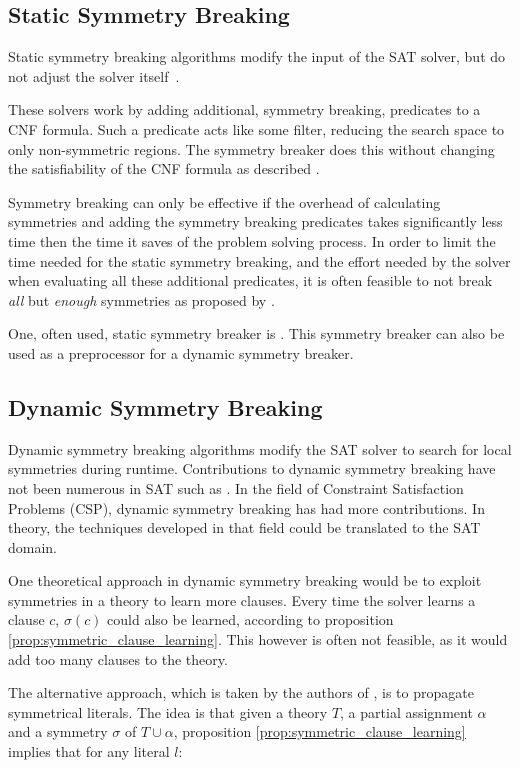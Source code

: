 \subsection{Static Symmetry Breaking}
	Static symmetry breaking algorithms modify the input of the SAT solver, but do not
	adjust the solver itself~\cite{sakallah2009symmetry}.

	These solvers work by adding additional, symmetry breaking, predicates to a CNF 
	formula. Such a predicate acts like some filter, reducing the search space to only 
	non-symmetric regions. The symmetry breaker does this without changing the 
	satisfiability of the CNF formula as described \cite{aloul2003shatter}.

	Symmetry breaking can only be effective if the overhead of calculating symmetries and
	adding the symmetry breaking predicates takes significantly less time then the time it
	saves of the problem solving process. In order to limit the time needed for the static
	symmetry breaking, and the effort needed by the solver when evaluating all these
	additional predicates, it is often feasible to not break \emph{all} but \emph{enough} 
	symmetries as proposed by \cite{aloul2003shatter}.
	
	One, often used, static symmetry breaker is \cite{aloul2003shatter}. This symmetry
	breaker can also be used as a preprocessor for a dynamic symmetry breaker.

\subsection{Dynamic Symmetry Breaking}
	Dynamic symmetry breaking algorithms modify the SAT solver to search for local
	symmetries during runtime. Contributions to dynamic symmetry breaking have not been
	numerous in SAT such as \cite{sabharwal2005symchaff}. In the field of Constraint Satisfaction
	Problems (CSP), dynamic symmetry breaking has had more contributions.
	In theory, the techniques developed in that field could be translated to the SAT domain.

	One theoretical approach in dynamic symmetry breaking would be to exploit symmetries in
	a theory to learn more clauses.
	Every time the solver learns a clause $c$, $\sigma(c)$ could also be learned, according
	to proposition \ref{prop:symmetric_clause_learning}.
	This however is often not feasible, as it would add too many clauses to the theory.

	The alternative approach, which is taken by the authors of
	\cite{devriendt2012symmetry}, is to propagate symmetrical literals.
	The idea is that given a theory $T$, a partial assignment $\alpha$ and a symmetry
	$\sigma$ of $T \cup \alpha$, proposition \ref{prop:symmetric_clause_learning} implies
	that for any literal $l$:


